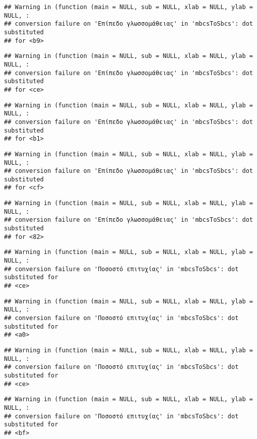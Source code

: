 \documentclass[
]{article}
\begin{document}
\begin{verbatim}
## Warning in (function (main = NULL, sub = NULL, xlab = NULL, ylab = NULL, :
## conversion failure on 'Επίπεδο γλωσσομάθειας' in 'mbcsToSbcs': dot substituted
## for <b9>
\end{verbatim}

\begin{verbatim}
## Warning in (function (main = NULL, sub = NULL, xlab = NULL, ylab = NULL, :
## conversion failure on 'Επίπεδο γλωσσομάθειας' in 'mbcsToSbcs': dot substituted
## for <ce>
\end{verbatim}

\begin{verbatim}
## Warning in (function (main = NULL, sub = NULL, xlab = NULL, ylab = NULL, :
## conversion failure on 'Επίπεδο γλωσσομάθειας' in 'mbcsToSbcs': dot substituted
## for <b1>
\end{verbatim}

\begin{verbatim}
## Warning in (function (main = NULL, sub = NULL, xlab = NULL, ylab = NULL, :
## conversion failure on 'Επίπεδο γλωσσομάθειας' in 'mbcsToSbcs': dot substituted
## for <cf>
\end{verbatim}

\begin{verbatim}
## Warning in (function (main = NULL, sub = NULL, xlab = NULL, ylab = NULL, :
## conversion failure on 'Επίπεδο γλωσσομάθειας' in 'mbcsToSbcs': dot substituted
## for <82>
\end{verbatim}

\begin{verbatim}
## Warning in (function (main = NULL, sub = NULL, xlab = NULL, ylab = NULL, :
## conversion failure on 'Ποσοστό επιτυχίας' in 'mbcsToSbcs': dot substituted for
## <ce>
\end{verbatim}

\begin{verbatim}
## Warning in (function (main = NULL, sub = NULL, xlab = NULL, ylab = NULL, :
## conversion failure on 'Ποσοστό επιτυχίας' in 'mbcsToSbcs': dot substituted for
## <a0>
\end{verbatim}

\begin{verbatim}
## Warning in (function (main = NULL, sub = NULL, xlab = NULL, ylab = NULL, :
## conversion failure on 'Ποσοστό επιτυχίας' in 'mbcsToSbcs': dot substituted for
## <ce>
\end{verbatim}

\begin{verbatim}
## Warning in (function (main = NULL, sub = NULL, xlab = NULL, ylab = NULL, :
## conversion failure on 'Ποσοστό επιτυχίας' in 'mbcsToSbcs': dot substituted for
## <bf>
\end{verbatim}
\end{document}
